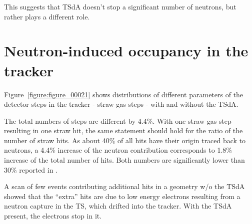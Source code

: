 \documentclass[12pt]{article}
\begin{document}
This suggests that TSdA doesn't stop a significant number of neutrons,
but rather plays a different role.


\section{Neutron-induced occupancy in the tracker}

Figure~\ref{figure:figure_00021} shows distributions of different
parameters of the detector steps in the tracker - straw gas steps - with and without the TSdA.

The total numbers of steps are different by 4.4\%. With one straw gas step resulting
in one straw hit, the same statement should hold for the ratio of the number of straw hits.
%
As about 40\% of all hits have their origin traced back to neutrons, a 4.4\% increase of the
neutron contribution corresponds to 1.8\% increase of the total number of hits.
Both numbers are significantly lower than 30\% reported in \cite{MU2E_3479_NEUTRON_SHIELDING}.

A scan of few events contributing additional hits in a geometry w/o the TSdA showed that
the ``extra'' hits are due to low energy electrons resulting from a neutron capture in the TS,
which drifted into the tracker. With the TSdA present, the electrons stop in it.
\end{document}
